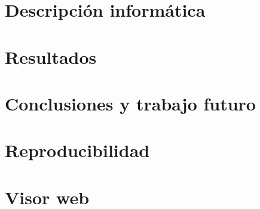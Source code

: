 \documentclass[11pt,a4paper,oneside]{report}
\begin{document}
\chapter{Descripción informática}
\label{cap:descripcion-informatica}


\chapter{Resultados}
\label{cap:resultados}


\chapter{Conclusiones y trabajo futuro}
\label{cap:conclusiones}



\cleardoublepage
\printbibliography[heading=bibintoc]


\appendix
{} %

\chapter{Reproducibilidad}
\label{anexo:reproducibilidad}


\chapter{Visor web}
\label{anexo:visor-web}

\end{document}
